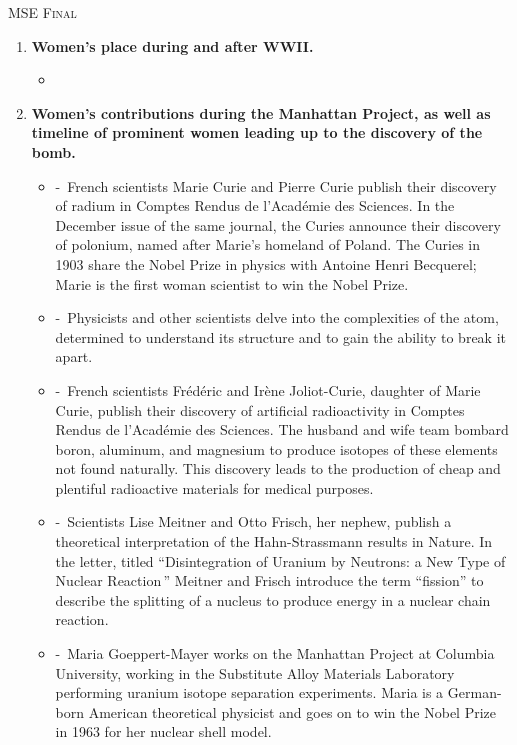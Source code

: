 \documentclass[12pt,a4paper]{article}
\begin{document}
  \begin{center}
    \large\textsc{MSE Final}
  \end{center}

\begin{enumerate}
  \item \textbf{Women's place during and after WWII.}
  \begin{itemize}
    \item[] 
  \end{itemize}
  \item \textbf{Women's contributions during the Manhattan Project, as well as timeline of prominent women leading up to the discovery of the bomb.}
  \begin{itemize}
    \item[]  -\ French scientists Marie Curie and Pierre Curie publish their discovery of radium in Comptes Rendus de l'Académie des Sciences. In the December issue of the same journal, the Curies announce their discovery of polonium, named after Marie's homeland of Poland. The Curies in 1903 share the Nobel Prize in physics with Antoine Henri Becquerel; Marie is the first woman scientist to win the Nobel Prize.
    \item[]  -\ Physicists and other scientists delve into the complexities of the atom, determined to understand its structure and to gain the ability to break it apart.
    \item[]  -\ French scientists Frédéric and Irène Joliot-Curie, daughter of Marie Curie, publish their discovery of artificial radioactivity in Comptes Rendus de l'Académie des Sciences. The husband and wife team bombard boron, aluminum, and magnesium to produce isotopes of these elements not found naturally. This discovery leads to the production of cheap and plentiful radioactive materials for medical purposes.
    \item[]  -\ Scientists Lise Meitner and Otto Frisch, her nephew, publish a theoretical interpretation of the Hahn-Strassmann results in Nature. In the letter, titled ``Disintegration of Uranium by Neutrons: a New Type of Nuclear Reaction\,'' Meitner and Frisch introduce the term ``fission'' to describe the splitting of a nucleus to produce energy in a nuclear chain reaction.
    \item[]  -\ Maria Goeppert-Mayer works on the Manhattan Project at Columbia University, working in the Substitute Alloy Materials Laboratory performing uranium isotope separation experiments. Maria is a German-born American theoretical physicist and goes on to win the Nobel Prize in 1963 for her nuclear shell model.

\end{itemize}
\end{enumerate}
\end{document}
